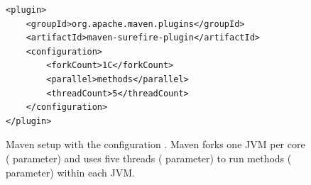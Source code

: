 \begin{figure}[h!]
\centering
\scriptsize
{}
\begin{lstlisting}
<plugin>
    <groupId>org.apache.maven.plugins</groupId>
    <artifactId>maven-surefire-plugin</artifactId>
    <configuration>
        <forkCount>1C</forkCount>
        <parallel>methods</parallel>
        <threadCount>5</threadCount>
    </configuration>
</plugin>
\end{lstlisting}
    \caption{\label{fig:surefire} Maven setup with the configuration
    \ForkParMeth{}.  Maven forks one JVM per core (
    parameter) and uses five threads ( parameter)
    to run methods ( parameter) within each JVM.}
\end{figure}


